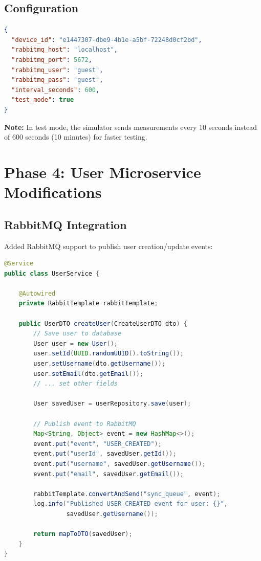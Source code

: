 \documentclass[12pt,a4paper]{article}
\begin{document}
\subsection{Configuration}

\begin{lstlisting}[language=json,caption=config.json]
{
  "device_id": "e1447307-dbe9-4b1e-a5bf-72248d0cf2bd",
  "rabbitmq_host": "localhost",
  "rabbitmq_port": 5672,
  "rabbitmq_user": "guest",
  "rabbitmq_pass": "guest",
  "interval_seconds": 600,
  "test_mode": true
}
\end{lstlisting}

\textbf{Note:} In test mode, the simulator sends measurements every 10 seconds instead of 600 seconds (10 minutes) for faster testing.

\newpage

\section{Phase 4: User Microservice Modifications}

\subsection{RabbitMQ Integration}

Added RabbitMQ support to publish user creation/update events:

\begin{lstlisting}[language=Java,caption=UserService.java - Event Publishing]
@Service
public class UserService {
    
    @Autowired
    private RabbitTemplate rabbitTemplate;
    
    public UserDTO createUser(CreateUserDTO dto) {
        // Save user to database
        User user = new User();
        user.setId(UUID.randomUUID().toString());
        user.setUsername(dto.getUsername());
        user.setEmail(dto.getEmail());
        // ... set other fields
        
        User savedUser = userRepository.save(user);
        
        // Publish event to RabbitMQ
        Map<String, Object> event = new HashMap<>();
        event.put("event", "USER_CREATED");
        event.put("userId", savedUser.getId());
        event.put("username", savedUser.getUsername());
        event.put("email", savedUser.getEmail());
        
        rabbitTemplate.convertAndSend("sync_queue", event);
        log.info("Published USER_CREATED event for user: {}", 
                 savedUser.getUsername());
        
        return mapToDTO(savedUser);
    }
}
\end{lstlisting}
\end{document}

